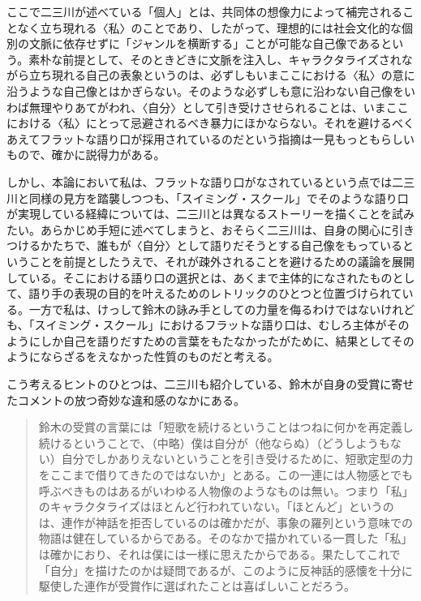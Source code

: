\documentclass[uplatex,a4paper,oneside,landscape]{jsarticle}
\begin{document}
ここで⼆三川が述べている「個⼈」とは、共同体の想像⼒によって補完されることなく⽴ち現れる〈私〉のことであり、したがって、理想的には社会⽂化的な個別の⽂脈に依存せずに「ジャンルを横断する」ことが可能な⾃⼰像であるという。素朴な前提として、そのときどきに⽂脈を注⼊し、キャラクタライズされながら⽴ち現れる⾃⼰の表象というのは、必ずしもいまここにおける〈私〉の意に沿うような⾃⼰像とはかぎらない。そのような必ずしも意に沿わない⾃⼰像をいわば無理やりあてがわれ、〈⾃分〉として引き受けさせられることは、いまここにおける〈私〉にとって忌避されるべき暴⼒にほかならない。それを避けるべくあえてフラットな語り⼝が採⽤されているのだという指摘は⼀⾒もっともらしいもので、確かに説得⼒がある。

しかし、本論において私は、フラットな語り⼝がなされているという点では⼆三川と同様の⾒⽅を踏襲しつつも、「スイミング・スクール」でそのような語り⼝が実現している経緯については、⼆三川とは異なるストーリーを描くことを試みたい。あらかじめ⼿短に述べてしまうと、おそらく⼆三川は、⾃⾝の関⼼に引きつけるかたちで、誰もが〈自分〉として語りだそうとする自己像をもっているということを前提としたうえで、それが疎外されることを避けるための議論を展開している。そこにおける語り⼝の選択とは、あくまで主体的になされたものとして、語り⼿の表現の⽬的を叶えるためのレトリックのひとつと位置づけられている。⼀⽅で私は、けっして鈴⽊の詠み⼿としての⼒量を侮るわけではないけれども、「スイミング・スクール」におけるフラットな語り⼝は、むしろ主体がそのようにしか⾃⼰を語りだすための⾔葉をもたなかったがために、結果としてそのようにならざるをえなかった性質のものだと考える。

こう考えるヒントのひとつは、⼆三川も紹介している、鈴⽊が⾃⾝の受賞に寄せたコメントの放つ奇妙な違和感のなかにある。

\begin{quote}
鈴⽊の受賞の⾔葉には「短歌を続けるということはつねに何かを再定義し続けるということで、（中略）僕は⾃分が（他ならぬ）（どうしようもない）⾃分でしかありえないということを引き受けるために、短歌定型の⼒をここまで借りてきたのではないか」とある。この⼀連には⼈物感とでも呼ぶべきものはあるがいわゆる⼈物像のようなものは無い。つまり「私」のキャラクタライズはほとんど⾏われていない。「ほとんど」というのは、連作が神話を拒否しているのは確かだが、事象の羅列という意味での物語は健在しているからである。そのなかで描かれている⼀貫した「私」は確かにおり、それは僕には⼀様に思えたからである。果たしてこれで「⾃分」を描けたのかは疑問であるが、このように反神話的感懐を⼗分に駆使した連作が受賞作に選ばれたことは喜ばしいことだろう。
\end{quote}
\end{document}
